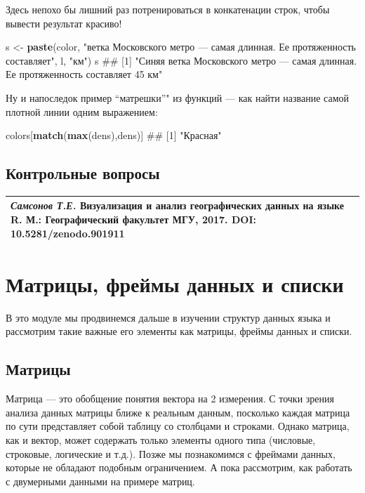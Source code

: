 \documentclass[]{book}
\newenvironment{Shaded}{\begin{snugshade}}{\end{snugshade}}
\newcommand{\KeywordTok}[1]{\textcolor[rgb]{0.13,0.29,0.53}{\textbf{#1}}}
\newcommand{\StringTok}[1]{\textcolor[rgb]{0.31,0.60,0.02}{#1}}
\newcommand{\NormalTok}[1]{#1}
\begin{document}
Здесь непохо бы лишний раз потренироваться в конкатенации строк, чтобы
вывести результат красиво!

\begin{Shaded}
\begin{Highlighting}[]
\NormalTok{s <-}\StringTok{ }\KeywordTok{paste}\NormalTok{(color, }\StringTok{"ветка Московского метро — самая длинная. Ее протяженность составляет"}\NormalTok{, l, }\StringTok{"км"}\NormalTok{)}
\NormalTok{s}
\NormalTok{## [1] "Синяя ветка Московского метро — самая длинная. Ее протяженность составляет 45 км"}
\end{Highlighting}
\end{Shaded}

Ну и напоследок пример ``матрешки''" из функций --- как найти название
самой плотной линии одним выражением:

\begin{Shaded}
\begin{Highlighting}[]
\NormalTok{colors[}\KeywordTok{match}\NormalTok{(}\KeywordTok{max}\NormalTok{(dens),dens)]}
\NormalTok{## [1] "Красная"}
\end{Highlighting}
\end{Shaded}

\section{Контрольные вопросы}\label{questions_vectors}

\begin{longtable}[]{@{}l@{}}
\toprule
\emph{Самсонов Т.Е.} \textbf{Визуализация и анализ географических данных
на языке R.} М.: Географический факультет МГУ, 2017. DOI:
10.5281/zenodo.901911\tabularnewline
\bottomrule
\end{longtable}

\chapter{Матрицы, фреймы данных и списки}\label{matrix_dataframes}

В это модуле мы продвинемся дальше в изучении структур данных языка и
рассмотрим такие важные его элементы как матрицы, фреймы данных и
списки.

\section{Матрицы}\label{matrices}

Матрица --- это обобщение понятия вектора на 2 измерения. С точки зрения
анализа данных матрицы ближе к реальным данным, посколько каждая матрица
по сути представляет собой таблицу со столбцами и строками. Однако
матрица, как и вектор, может содержать только элементы одного типа
(числовые, строковые, логические и т.д.). Позже мы познакомимся с
фреймами данных, которые не обладают подобным ограничением. А пока
рассмотрим, как работать с двумерными данными на примере матриц.
\end{document}
